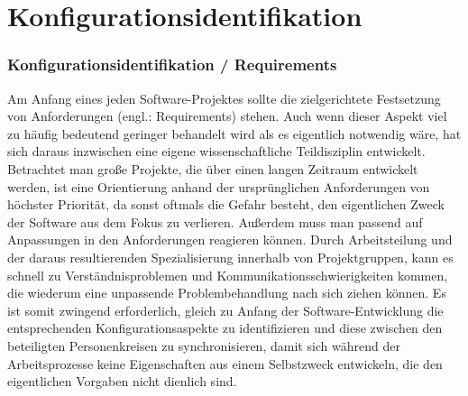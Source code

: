 \chapter{Konfigurationsidentifikation}
\subsection{Konfigurationsidentifikation / Requirements}
Am Anfang eines jeden Software-Projektes sollte die zielgerichtete Festsetzung von Anforderungen (engl.: Requirements) stehen. Auch wenn dieser Aspekt viel zu häufig bedeutend geringer behandelt wird als es eigentlich notwendig wäre, hat sich daraus inzwischen eine eigene wissenschaftliche Teildisziplin entwickelt. Betrachtet man große Projekte, die über einen langen Zeitraum entwickelt werden, ist eine Orientierung anhand der ursprünglichen Anforderungen von höchster Priorität, da sonst oftmals die Gefahr besteht, den eigentlichen Zweck der Software aus dem Fokus zu verlieren. Außerdem muss man passend auf Anpassungen in den Anforderungen reagieren können. Durch Arbeitsteilung und der daraus resultierenden Spezialisierung innerhalb von Projektgruppen, kann es schnell zu Verständnisproblemen und Kommunikationsschwierigkeiten kommen, die wiederum eine unpassende Problembehandlung nach sich ziehen können. Es ist somit zwingend erforderlich, gleich zu Anfang der Software-Entwicklung die entsprechenden Konfigurationsaspekte zu identifizieren und diese zwischen den beteiligten Personenkreisen zu synchronisieren, damit sich während der Arbeitsprozesse keine Eigenschaften aus einem Selbstzweck entwickeln, die den eigentlichen Vorgaben nicht dienlich sind.


